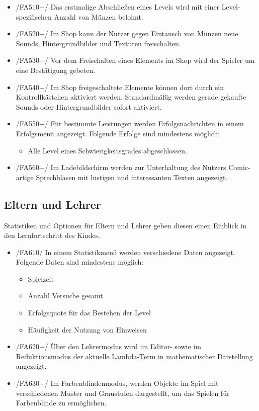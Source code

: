 \begin{itemize}
\item /FA510+/ Das erstmalige Abschließen eines Levels wird mit einer Level-spezifischen Anzahl von Münzen belohnt.
\item /FA520+/ Im Shop kann der Nutzer gegen Eintausch von Münzen neue Sounds, Hintergrundbilder und Texturen freischalten.
\item /FA530+/ Vor dem Freischalten eines Elements im Shop wird der Spieler um eine Bestätigung gebeten.
\item /FA540+/ Im Shop freigeschaltete Elemente können dort durch ein Kontrollkästchen aktiviert werden. Standardmäßig werden gerade gekaufte Sounds oder Hintergrundbilder sofort aktiviert.
\item /FA550+/ Für bestimmte Leistungen werden Erfolgsnachrichten in einem Erfolgsmenü angezeigt. Folgende Erfolge sind mindestens möglich:
\begin{itemize}
\item Alle Level eines Schwierigkeitsgrades abgeschlossen.
\end{itemize}
\item /FA560+/ Im Ladebildschirm werden zur Unterhaltung des Nutzers Comic-artige Sprechblasen mit lustigen und interessanten Texten angezeigt.
\end{itemize}

\subsection{Eltern und Lehrer}

Statistiken und Optionen für Eltern und Lehrer geben diesen einen Einblick in den Lernfortschritt des Kindes.

\begin{itemize}
\item /FA610/ In einem Statistikmenü werden verschiedene Daten angezeigt. Folgende Daten sind mindestens möglich:
\begin{itemize}
\item Spielzeit
\item Anzahl Versuche gesamt
\item Erfolgsquote für das Bestehen der Level
\item Häufigkeit der Nutzung von Hinweisen
\end{itemize}
\item /FA620+/ Über den Lehrermodus wird im Editor- sowie im Reduktionsmodus der aktuelle Lambda-Term in mathematischer Darstellung angezeigt.
\item /FA630+/ Im Farbenblindenmodus, werden Objekte im Spiel mit verschiedenen Muster und Graustufen dargestellt, um das Spielen für Farbenblinde zu ermöglichen.
\end{itemize}

